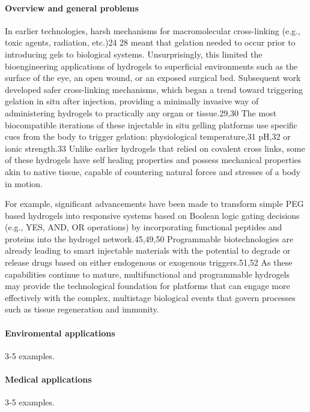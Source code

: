 \paragraph{Overview and general problems}
In earlier technologies, harsh mechanisms for macromolecular cross-linking (e.g., toxic agents, radiation, etc.)24 28 meant that gelation needed to occur prior to introducing gels to biological systems. 
Unsurprisingly, this limited the bioengineering applications of hydrogels to superficial environments such as the surface of the eye, an open wound, or an exposed surgical bed. 
Subsequent work developed safer cross-linking mechanisms, which began a trend toward triggering gelation in situ after injection, providing a minimally invasive way of administering  hydrogels to practically any organ or tissue.29,30 
The most biocompatible iterations of these injectable in situ gelling platforms use specific cues from the body to trigger gelation:  physiological temperature,31 pH,32 or ionic strength.33 
Unlike earlier hydrogels that relied on covalent cross links, some of these hydrogels have self healing properties and possess mechanical properties akin to native tissue, capable of countering natural forces and stresses of a body in motion\citep{correaTranslationalApplicationsHydrogels2021}.

For example, significant advancements have been made to transform simple PEG based  hydrogels into responsive systems based on Boolean logic gating decisions (e.g., YES, AND, OR operations) by incorporating functional peptides and proteins into the  hydrogel network.45,49,50\citep{correaTranslationalApplicationsHydrogels2021}
Programmable biotechnologies are already leading to smart injectable materials with the potential to degrade or release drugs based on either endogenous or  exogenous triggers.51,52\citep{correaTranslationalApplicationsHydrogels2021}
As these capabilities continue to mature, multifunctional and programmable hydrogels may provide the technological foundation for platforms that can engage more effectively with the complex, multistage biological events that govern processes such as tissue regeneration and immunity.




\paragraph{Enviromental applications} 3-5 examples.

\paragraph{Medical applications} 3-5 examples.

